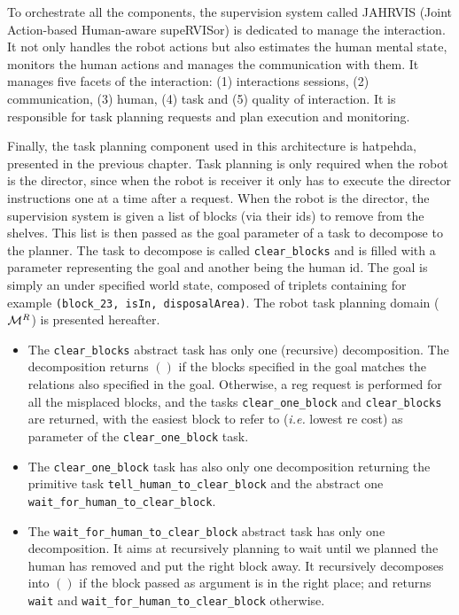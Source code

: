 \documentclass[a4paper,11pt,twoside]{StyleThese}
\begin{document}
To orchestrate all the components, the supervision system called JAHRVIS (Joint Action-based Human-aware supeRVISor) is dedicated to manage the interaction. It not only handles the robot actions but also estimates the human mental state, monitors the human actions and manages the communication with them. It manages five facets of the interaction: (1) interactions sessions, (2) communication, (3) human, (4) task and (5) quality of interaction. It is responsible for task planning requests and plan execution and monitoring.

Finally, the task planning component used in this architecture is \acrshort{hatpehda}, presented in the previous chapter. Task planning is only required when the robot is the director, since when the robot is receiver it only has to execute the director instructions one at a time after a request. When the robot is the director, the supervision system is given a list of blocks (via their ids) to remove from the shelves. This list is then passed as the goal parameter of a task to decompose to the planner.
The task to decompose is called \verb'clear_blocks' and is filled with a parameter representing the goal and another being the human id. The goal is simply an under specified world state, composed of triplets containing for example \verb'(block_23, isIn, disposalArea)'.
The robot task planning domain ($\mathcal{M}^R$) is presented hereafter. 
\begin{itemize}
\item The \verb'clear_blocks' abstract task has only one (recursive) decomposition. The decomposition returns $()$ if the blocks specified in the goal matches the relations also specified in the goal. Otherwise, a \acrshort{reg} request is performed for all the misplaced blocks, and the tasks \verb'clear_one_block' and \verb'clear_blocks' are returned, with the easiest block to refer to (\textit{i.e.} lowest \acrshort{re} cost) as parameter of the \verb'clear_one_block' task.
\item The \verb'clear_one_block' task has also only one decomposition returning the primitive task \verb'tell_human_to_clear_block' and the abstract one \verb'wait_for_human_to_clear_block'.
\item The \verb'wait_for_human_to_clear_block' abstract task has only one decomposition. It aims at recursively planning to wait until we planned the human has removed and put the right block away. It recursively decomposes into $()$ if the block passed as argument is in the right place; and returns \verb'wait' and \verb'wait_for_human_to_clear_block' otherwise.
\end{itemize}
\end{document}

